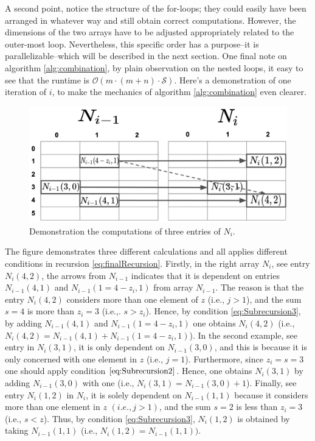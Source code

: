 \documentclass[a4paper]{article}
\begin{document}
A second point, notice the structure of the for-loops; they could easily have been arranged in whatever way and still obtain correct computations. However, the dimensions of the two arrays have to be adjusted appropriately related to the outer-most loop. Nevertheless, this specific order has a purpose–it is parallelizable–which will be described in the next section.
One final note on algorithm \ref{alg:combination}, by plain observation on the nested loops, it easy to see that the runtime is $\mathcal{O}(m\cdot (m+n)\cdot \mathcal{S})$.
Here's a demonstration of one iteration of $i$, to make the mechanics of algorithm \ref{alg:combination} even clearer.
\begin{figure}[H]
\centering
\includegraphics[height=0.45\textwidth]{figures/exampleparallelized.png}
\caption{Demonstration the computations of three entries of $N_{i}$.}\label{normal_calibration.png}
\end{figure}
The figure demonstrates three different calculations and all applies different conditions in recursion \ref{eq:finalRecursion}. Firstly, in the right array $N_{i}$, see entry $N_{i}(4,2)$, the arrows from $N_{i-1}$ indicates that it is dependent on entries $N_{i-1}(4,1)$ and $N_{i-1}(1=4-z_{i},1)$ from array $N_{i-1}$. The reason is that the entry $N_{i}(4,2)$ considers more than one element of $z$ (i.e., $j>1$), and the sum $s=4$ is more than $z_{i}=3$ (i.e.,. $s>z_{i}$). Hence, by condition \ref{eq:Subrecursion3}, by adding $N_{i-1}(4,1)$ and $N_{i-1}(1=4-z_{i},1)$ one obtains $N_{i}(4,2)$ (i.e., $N_{i}(4,2)=N_{i-1}(4,1) +N_{i-1}(1=4-z_{i},1)$). 
In the second example, see entry  in $N_{i}(3,1)$, it is only dependent on $N_{i-1}(3,0)$, and this is because it is only concerned with one element in $z$ (i.e., $j=1$). Furthermore, since $z_{i}=s=3$ one should apply condition $\ref{eq:Subrecursion2}$. Hence, one obtains $N_{i}(3,1)$ by adding $N_{i-1}(3,0)$ with one (i.e., $N_{i}(3,1)=N_{i-1}(3,0)+1$). 
Finally, see entry $N_{i}(1,2)$ in $N_{i}$, it is solely dependent on $N_{i-1}(1,1)$ because it considers more than one element in $z$ $(i.e., j>1)$, and the sum $s=2$ is less than $z_{i}=3$ (i.e., $s<z$). Thus, by condition \ref{eq:Subrecursion3},  $N_{i}(1,2)$ is obtained by taking $N_{i-1}(1,1)$ (i.e., $N_{i}(1,2)=N_{i-1}(1,1)).$
\end{document}
